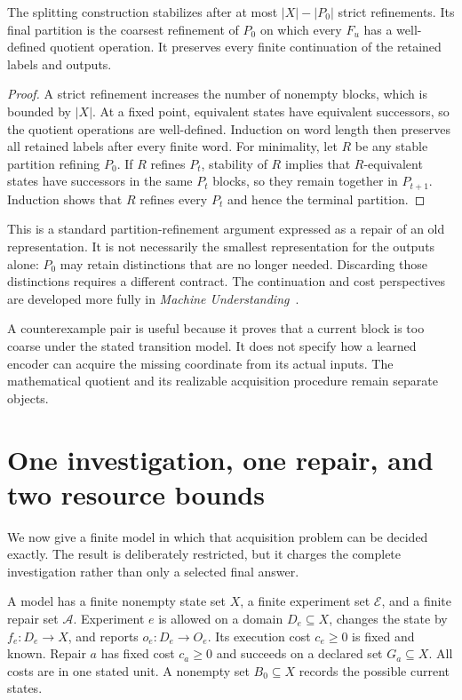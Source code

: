 \begin{SIIproposition}\label{SII:prop:refinement}
The splitting construction stabilizes after at most $|X|-|P_0|$ strict refinements. Its final partition is the coarsest refinement of $P_0$ on which every $F_u$ has a well-defined quotient operation. It preserves every finite continuation of the retained labels and outputs.
\end{SIIproposition}
\begin{proof}
A strict refinement increases the number of nonempty blocks, which is bounded by $|X|$. At a fixed point, equivalent states have equivalent successors, so the quotient operations are well-defined. Induction on word length then preserves all retained labels after every finite word. For minimality, let $R$ be any stable partition refining $P_0$. If $R$ refines $P_t$, stability of $R$ implies that $R$-equivalent states have successors in the same $P_t$ blocks, so they remain together in $P_{t+1}$. Induction shows that $R$ refines every $P_t$ and hence the terminal partition.
\end{proof}

This is a standard partition-refinement argument expressed as a repair of an old representation. It is not necessarily the smallest representation for the outputs alone: $P_0$ may retain distinctions that are no longer needed. Discarding those distinctions requires a different contract. The continuation and cost perspectives are developed more fully in \emph{Machine Understanding}~\cite{SII:understanding}.

A counterexample pair is useful because it proves that a current block is too coarse under the stated transition model. It does not specify how a learned encoder can acquire the missing coordinate from its actual inputs. The mathematical quotient and its realizable acquisition procedure remain separate objects.

\section{One investigation, one repair, and two resource bounds}\label{SII:sec:synthesis}
We now give a finite model in which that acquisition problem can be decided exactly. The result is deliberately restricted, but it charges the complete investigation rather than only a selected final answer.

\begin{SIIdefinition}\label{SII:def:repairmodel}
A model has a finite nonempty state set $X$, a finite experiment set $\mathcal E$, and a finite repair set $\mathcal A$. Experiment $e$ is allowed on a domain $D_e\subseteq X$, changes the state by $f_e:D_e\to X$, and reports $o_e:D_e\to O_e$. Its execution cost $c_e\geq0$ is fixed and known. Repair $a$ has fixed cost $c_a\geq0$ and succeeds on a declared set $G_a\subseteq X$. All costs are in one stated unit. A nonempty set $B_0\subseteq X$ records the possible current states.
\end{SIIdefinition}


